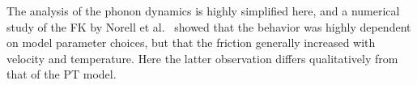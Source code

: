 The analysis of the phonon dynamics is highly simplified here, and a numerical study of the \acrshort{FK} by Norell et al.\ \cite{FK2D} showed that the behavior was highly dependent on model parameter choices, but that the friction generally increased with velocity and temperature. Here the latter observation differs qualitatively from that of the \acrshort{PT} model.























